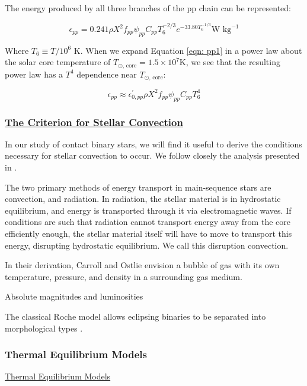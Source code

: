 \documentclass[12pt]{article} %
\numberwithin{equation}{section} %
\begin{document}
The energy produced by all three branches of the pp chain can be represented:

\begin{equation} \label{eqn: pp1}
\epsilon_{pp} = 0.241 \rho X^{2} f_{pp} \psi_{pp} C_{pp} T_{6}^{-2/3} e^{-33.80 T_{6}^{-1/3}} \text{W } \text{kg}^{-1}
\end{equation}

Where $T_{6} \equiv T / 10^{6}$ K. When we expand Equation \ref{eqn: pp1} in a power law about the solar core temperature of $T_{\odot \text{, core}} = 1.5 \times 10^{7}$K, we see that the resulting power law has a $T^{4}$ dependence near $T_{\odot \text{, core}}$:

\begin{equation} \label{eqn: pp2}
\epsilon_{pp} \approx \epsilon_{0, pp}^{'} \rho X^{2} f_{pp} \psi_{pp} C_{pp} T_{6}^{4}
\end{equation}

\subsubsection[The Criterion for Stellar Convection]{\hyperlink{toc}{The Criterion for Stellar Convection}} \label{sec: The Criterion for Stellar Convection}

In our study of contact binary stars, we will find it useful to derive the conditions necessary for stellar convection to occur. We follow closely the analysis presented in \citet{carroll2006introduction}.

The two primary methods of energy transport in main-sequence stars are convection, and radiation. In radiation, the stellar material is in hydrostatic equilibrium, and energy is transported through it via electromagnetic waves. If conditions are such that radiation cannot transport energy away from the core efficiently enough, the stellar material itself will have to move to transport this energy, disrupting hydrostatic equilibrium. We call this disruption convection. 

In their derivation, Carroll and Ostlie envision a bubble of gas with its own temperature, pressure, and density in a surrounding gas medium. 

Absolute magnitudes and luminosities \citep{rucinski1997absolute} \citep{rucinski2006luminosity}

The classical Roche model allows eclipsing binaries to be separated into morphological types \citep{terrell2001eclipsing}.


\subsubsection{Thermal Equilibrium Models}{\hyperlink{toc}{Thermal Equilibrium Models}} \label{sec: Thermal Equilibrium Models}
\end{document}
